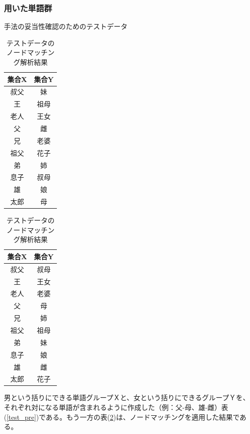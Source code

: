 \subsubsection{用いた単語群}
\begin{table}[h]
  \begin{minipage}[t]{.45\textwidth}
    \caption[テストデータ]{手法の妥当性確認のためのテストデータ}
    \label{test_pre}
    \begin{center}
      \begin{tabular}{|c||c|} \hline
        集合X & 集合Y \\ \hline \hline
        叔父 & 妹 \\
        王 & 祖母 \\
        老人 & 王女 \\
        父 & 雌 \\
        兄 & 老婆 \\
        祖父 & 花子 \\
        弟 & 姉 \\
        息子 & 叔母 \\
        雄 & 娘 \\
        太郎 & 母 \\ \hline
      \end{tabular}
    \end{center}
  \end{minipage}
  \hfill
  \begin{minipage}[t]{.45\textwidth}
    \caption[テストデータのノードマッチング解析結果]{テストデータのノードマッチング解析結果}
    \label{test_bfr}
    \begin{center}
      \begin{tabular}{|c||c|} \hline
        集合X & 集合Y \\ \hline \hline
        叔父 & 叔母 \\
        王 & 王女 \\
        老人 & 老婆 \\
        父 & 母 \\
        兄 & 姉 \\
        祖父 & 祖母 \\
        弟 & 妹 \\
        息子 & 娘 \\
        雄 & 雌 \\
        太郎 & 花子 \\ \hline
      \end{tabular}
    \end{center}
  \end{minipage}
\end{table}
男という括りにできる単語グループＸと、女という括りにできるグループＹを、それぞれ対になる単語が含まれるように作成した（例：父-母、雄-雌）表(\ref{test_pre})である。もう一方の表(\ref{test_bfr})は、ノードマッチングを適用した結果である。

